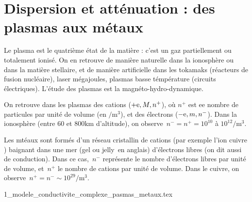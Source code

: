 \chapter[Dispersion et atténuation]{Dispersion et atténuation : des plasmas aux métaux}

Le plasma est le quatrième état de la matière : c'est un gaz partiellement ou totalement ionisé. On en retrouve de manière naturelle dans la ionosphère ou dans la matière stellaire, et de manière artificielle dans les tokamaks (réacteurs de fusion nucléaire), laser mégajoules, plasmas basse témpérature (circuits électriques). L'étude des plasmas est la magnéto-hydro-dynamique.

On retrouve dans les plasmas des cations ($+\mathrm{e},M,n^{+}$), où $n^{+}$ est ee nombre de particules par unité de volume (en $\si{\per\metre\cubed}$), et des électrons ($-\mathrm{e},m,n^{-}$). Dans la ionosphère (entre 60 et 800$\si{\kilo\metre}$ d'altitude), on observe~$n^{-}=n^{+}=10^{10}$ à $10^{12}\si{\per\metre\cubed}$.

Les mtéaux sont formés d'un réseau cristallin de cations (par exemple l'ion cuivre ) baignant dans une mer (gel ou \og jelly\fg~en anglais) d'électrons libres (on dit aussi de conduction). Dans ce cas,~$n^{-}$ représente le nombre d'électrons libres par unité de volume, et~$n^{+}$ le nombre de cations par unité de volume. Dans le cuivre, on observe~$n^{+}=n^{-}\sim 10^{29}\si{\per\metre\cubed}$.


\minitoc

{1_modele_conductivite_complexe_pasmas_metaux.tex}